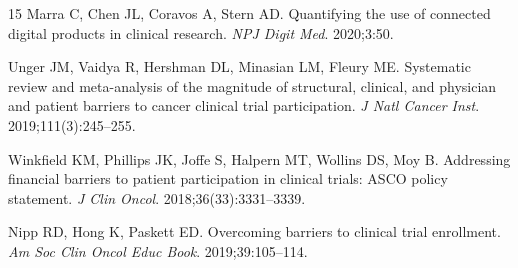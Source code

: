 \documentclass[12pt]{article}
\begin{document}
\begin{thebibliography}{15}
Marra C, Chen JL, Coravos A, Stern AD.
Quantifying the use of connected digital products in clinical research.
\textit{NPJ Digit Med}. 2020;3:50.

Unger JM, Vaidya R, Hershman DL, Minasian LM, Fleury ME.
Systematic review and meta-analysis of the magnitude of structural, clinical, and physician and patient barriers to cancer clinical trial participation.
\textit{J Natl Cancer Inst}. 2019;111(3):245--255.

Winkfield KM, Phillips JK, Joffe S, Halpern MT, Wollins DS, Moy B.
Addressing financial barriers to patient participation in clinical trials: ASCO policy statement.
\textit{J Clin Oncol}. 2018;36(33):3331--3339.

Nipp RD, Hong K, Paskett ED.
Overcoming barriers to clinical trial enrollment.
\textit{Am Soc Clin Oncol Educ Book}. 2019;39:105--114.

\end{thebibliography}
\end{document}
